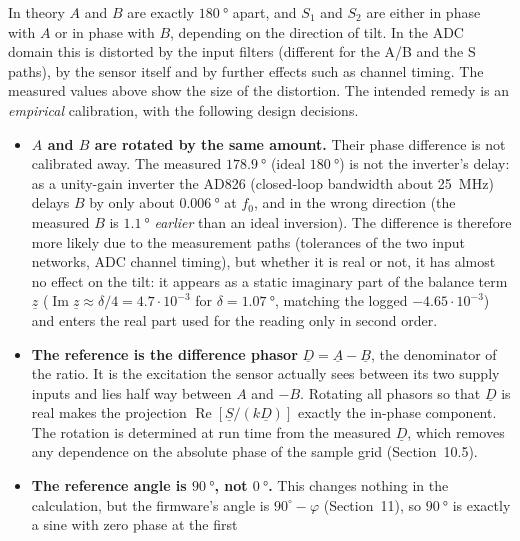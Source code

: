 \documentclass[11pt,a4paper]{article}
\begin{document}
In theory $A$ and $B$ are exactly $\SI{180}{\degree}$ apart, and $S_1$ and
$S_2$ are either in phase with $A$ or in phase with $B$, depending on the
direction of tilt.  In the ADC domain this is distorted by the input
filters (different for the A/B and the S paths), by the sensor itself and by
further effects such as channel timing.  The measured values above show the
size of the distortion.  The intended remedy is an \emph{empirical}
calibration, with the following design decisions.

\begin{itemize}
  \item \textbf{$A$ and $B$ are rotated by the same amount.}  Their
        phase difference is not calibrated away.  The measured
        $\SI{178.9}{\degree}$ (ideal $\SI{180}{\degree}$) is not the
        inverter's delay: as a unity-gain inverter the AD826 (closed-loop
        bandwidth about \SI{25}{\mega\hertz}) delays $B$ by only about
        $\SI{0.006}{\degree}$ at $f_0$, and in the wrong direction (the
        measured $B$ is $\SI{1.1}{\degree}$ \emph{earlier} than an ideal
        inversion).  The difference is therefore more likely due to the
        measurement paths (tolerances of the two input networks, ADC
        channel timing), but whether it is real or not, it has almost no
        effect on the tilt: it appears as a static imaginary part of the
        balance term $\underline{z}$ ($\operatorname{Im}\underline{z}
        \approx \delta/4 = 4.7\cdot10^{-3}$ for $\delta=\SI{1.07}{\degree}$,
        matching the logged $-4.65\cdot10^{-3}$) and enters the real part
        used for the reading only in second order.
  \item \textbf{The reference is the difference phasor}
        $\underline{D}=\underline{A}-\underline{B}$, the denominator of the
        ratio.  It is the excitation the sensor actually sees between its two
        supply inputs and lies half way between $A$ and $-B$.  Rotating all
        phasors so that $\underline{D}$ is real makes the projection
        $\operatorname{Re}[\underline{S}/(k\underline{D})]$ exactly the
        in-phase component.  The rotation is determined at run time from the
        measured $\underline{D}$, which removes any dependence on the
        absolute phase of the sample grid (Section~10.5).
  \item \textbf{The reference angle is $\SI{90}{\degree}$, not
        $\SI{0}{\degree}$.}  This changes nothing in the calculation, but
        the firmware's angle is $90^{\circ}-\varphi$ (Section~11), so
        $\SI{90}{\degree}$ is exactly a sine with zero phase at the first

\end{itemize}
\end{document}

